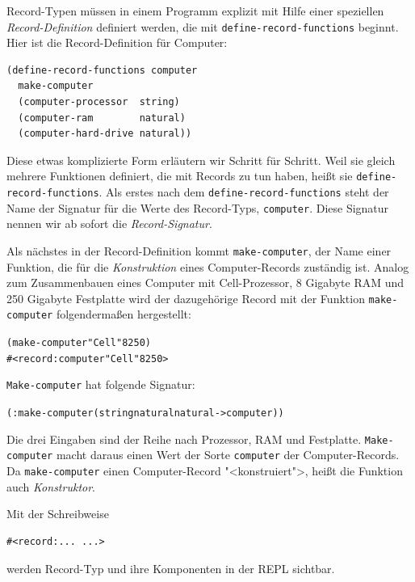 Record-Typen müssen in einem Programm explizit mit Hilfe einer
speziellen \textit{Record-Definition} definiert werden, die mit
\texttt{define-record-functions} beginnt.  Hier ist die
Record-Definition für
Computer:
%
\begin{verbatim}
(define-record-functions computer
  make-computer
  (computer-processor  string)
  (computer-ram        natural)
  (computer-hard-drive natural))
\end{verbatim}
%
Diese etwas komplizierte Form erläutern wir Schritt für Schritt.  Weil sie gleich mehrere
Funktionen definiert, die mit Records zu tun haben, heißt
sie \texttt{define-record-functions}.  Als erstes nach
dem \texttt{define-record-functions} steht der Name der Signatur für
die Werte des Record-Typs,
\texttt{computer}.  Diese Signatur nennen wir ab sofort die
\textit{Record-Signatur}.

Als nächstes in der Record-Definition kommt \texttt{make-computer},
der Name einer Funktion, die für die \textit{Konstruktion} eines
Computer-Records zuständig ist.  Analog zum Zusammenbauen eines
Computer mit Cell-Prozessor, 8 Gigabyte RAM und 250 Gigabyte
Festplatte wird der dazugehörige Record mit der Funktion
\texttt{make-computer} folgendermaßen hergestellt:
%
\begin{alltt}
(make-computer "Cell" 8 250)
\evalsto{} #<record:computer "Cell" 8 250>
\end{alltt}
%
\texttt{Make-computer} hat folgende Signatur:
%
\begin{alltt}
(: make-computer (string natural natural -> computer))
\end{alltt}
%
Die drei Eingaben sind der Reihe nach Prozessor, RAM und Festplatte.
\texttt{Make-computer} macht daraus einen Wert der Sorte
\texttt{computer} der Computer-Records.  Da \texttt{make-computer}
einen Computer-Record "<konstruiert">, heißt die Funktion auch
\textit{Konstruktor}.

Mit der Schreibweise
%
\begin{verbatim}
#<record:... ...>
\end{verbatim}
%
werden Record-Typ und ihre Komponenten in der REPL sichtbar.

